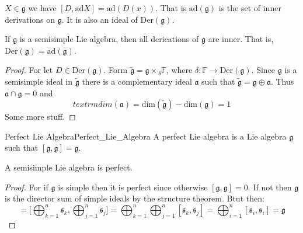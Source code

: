    $X\in\mathfrak{g}$ we have $[D,\textrm{ad}X]=\textrm{ad}(D(x))$. That is
    $\textrm{ad}(\mathfrak{g})$ is the set of inner derivations on
    $\mathfrak{g}$. It is also an ideal of $\textrm{Der}(\mathfrak{g})$.
    \begin{theorem}
        If $\mathfrak{g}$ is a semisimple Lie algebra, then all derications
        of $\mathfrak{g}$ are inner. That is,
        $\textrm{Der}(\mathfrak{g})=\textrm{ad}(\mathfrak{g})$.
    \end{theorem}
    \begin{proof}
        For let $D\in\textrm{Der}(\mathfrak{g})$. Form
        $\tilde{\mathfrak{g}}=\mathfrak{g}\times{_{\delta}\mathbb{F}}$,
        where $\delta:\mathbb{F}\rightarrow\textrm{Der}(\mathfrak{g})$.
        Since $\mathfrak{g}$ is a semisimple ideal in $\tilde{\mathfrak{g}}$
        there is a complementary ideal $\mathfrak{a}$ such that
        $\tilde{\mathfrak{g}}=\mathfrak{g}\oplus\mathfrak{a}$. Thus
        $\mathfrak{a}\cap\mathfrak{g}=0$ and
        \begin{equation}
            textrm{dim}(\mathfrak{a})
            =\textrm{dim}(\tilde{\mathfrak{g}})-\textrm{dim}(\mathfrak{g})
            =1
        \end{equation}
        Some more stuff.
    \end{proof}
    \begin{fdefinition}{Perfect Lie Algebra}{Perfect_Lie_Algebra}
        A perfect Lie algebra is a Lie algebra $\mathfrak{g}$ such that
        $[\mathfrak{g},\mathfrak{g}]=\mathfrak{g}$.
    \end{fdefinition}
    \begin{theorem}
        A semisimple Lie algebra is perfect.
    \end{theorem}
    \begin{proof}
        For if $\mathfrak{g}$ is simple then it is perfect since otherwise
        $[\mathfrak{g},\mathfrak{g}]=0$. If not then $\mathfrak{g}$ is the
        director sum of simple ideals by the structure theorem. Btut then:
        \begin{equation}
            [\mathfrak{g},\mathfrak{g}]
            =\Big[\bigoplus_{k=1}^{n}\mathfrak{s}_{k},
                  \bigoplus_{j=1}^{n}\mathfrak{s}_{j}\Big]
            =\bigoplus_{k=1}^{n}\bigoplus_{j=1}^{n}
                [\mathfrak{s}_{k},\mathfrak{s}_{j}]
            =\bigoplus_{i=1}^{n}[\mathfrak{s}_{i},\mathfrak{s}_{i}]
            =\mathfrak{g}
        \end{equation}
    \end{proof}

